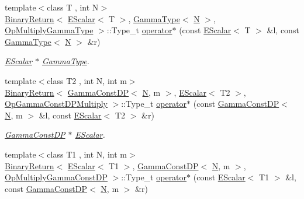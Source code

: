 \begin{DoxyCompactItemize}
{\footnotesize template$<$class T , int N$>$ }\\\mbox{\hyperlink{structENSEM_1_1BinaryReturn}{Binary\+Return}}$<$ \mbox{\hyperlink{classENSEM_1_1EScalar}{E\+Scalar}}$<$ T $>$, \mbox{\hyperlink{classENSEM_1_1GammaType}{Gamma\+Type}}$<$ \mbox{\hyperlink{operator__name__util_8cc_a7722c8ecbb62d99aee7ce68b1752f337}{N}} $>$, \mbox{\hyperlink{structENSEM_1_1OpMultiplyGammaType}{Op\+Multiply\+Gamma\+Type}} $>$\+::Type\+\_\+t \mbox{\hyperlink{group__escalar_gacd3a5ba72921d671ee94910188b8c179}{operator$\ast$}} (const \mbox{\hyperlink{classENSEM_1_1EScalar}{E\+Scalar}}$<$ T $>$ \&l, const \mbox{\hyperlink{classENSEM_1_1GammaType}{Gamma\+Type}}$<$ \mbox{\hyperlink{operator__name__util_8cc_a7722c8ecbb62d99aee7ce68b1752f337}{N}} $>$ \&r)
\begin{DoxyCompactList}\small\item\em \mbox{\hyperlink{classENSEM_1_1EScalar}{E\+Scalar}} $\ast$ \mbox{\hyperlink{classENSEM_1_1GammaType}{Gamma\+Type}}. \end{DoxyCompactList}\item 
{\footnotesize template$<$class T2 , int N, int m$>$ }\\\mbox{\hyperlink{structENSEM_1_1BinaryReturn}{Binary\+Return}}$<$ \mbox{\hyperlink{classENSEM_1_1GammaConstDP}{Gamma\+Const\+DP}}$<$ \mbox{\hyperlink{operator__name__util_8cc_a7722c8ecbb62d99aee7ce68b1752f337}{N}}, m $>$, \mbox{\hyperlink{classENSEM_1_1EScalar}{E\+Scalar}}$<$ T2 $>$, \mbox{\hyperlink{structENSEM_1_1OpGammaConstDPMultiply}{Op\+Gamma\+Const\+D\+P\+Multiply}} $>$\+::Type\+\_\+t \mbox{\hyperlink{group__escalar_ga37b9d878f5157952ec965d47a1032bc0}{operator$\ast$}} (const \mbox{\hyperlink{classENSEM_1_1GammaConstDP}{Gamma\+Const\+DP}}$<$ \mbox{\hyperlink{operator__name__util_8cc_a7722c8ecbb62d99aee7ce68b1752f337}{N}}, m $>$ \&l, const \mbox{\hyperlink{classENSEM_1_1EScalar}{E\+Scalar}}$<$ T2 $>$ \&r)
\begin{DoxyCompactList}\small\item\em \mbox{\hyperlink{classENSEM_1_1GammaConstDP}{Gamma\+Const\+DP}} $\ast$ \mbox{\hyperlink{classENSEM_1_1EScalar}{E\+Scalar}}. \end{DoxyCompactList}\item 
{\footnotesize template$<$class T1 , int N, int m$>$ }\\\mbox{\hyperlink{structENSEM_1_1BinaryReturn}{Binary\+Return}}$<$ \mbox{\hyperlink{classENSEM_1_1EScalar}{E\+Scalar}}$<$ T1 $>$, \mbox{\hyperlink{classENSEM_1_1GammaConstDP}{Gamma\+Const\+DP}}$<$ \mbox{\hyperlink{operator__name__util_8cc_a7722c8ecbb62d99aee7ce68b1752f337}{N}}, m $>$, \mbox{\hyperlink{structENSEM_1_1OpMultiplyGammaConstDP}{Op\+Multiply\+Gamma\+Const\+DP}} $>$\+::Type\+\_\+t \mbox{\hyperlink{group__escalar_gaa60096d471282c83dab865d42b53ce96}{operator$\ast$}} (const \mbox{\hyperlink{classENSEM_1_1EScalar}{E\+Scalar}}$<$ T1 $>$ \&l, const \mbox{\hyperlink{classENSEM_1_1GammaConstDP}{Gamma\+Const\+DP}}$<$ \mbox{\hyperlink{operator__name__util_8cc_a7722c8ecbb62d99aee7ce68b1752f337}{N}}, m $>$ \&r)

\end{DoxyCompactItemize}
